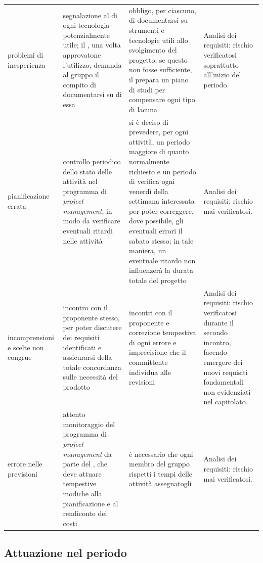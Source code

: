 	
\begin{adjustwidth}{-3cm}{-3cm}
\begin{center}
\begin{tabular}{| p{3cm} | p{3.5cm} | p{4cm} | p{3cm} |}

	problemi di inesperienza & segnalazione al \Rx{} di ogni tecnologia potenzialmente utile; il \Rx{}, una volta approvatone l'utilizzo, demanda al gruppo il compito di documentarsi su di essa & obbligo, per ciascuno, di documentarsi su strumenti e tecnologie utili allo svolgimento del progetto; se questo non fosse sufficiente, il \Rx{} prepara un piano di studi per compensare ogni tipo di lacuna & Analisi dei requisiti: rischio verificatosi soprattutto all'inizio del periodo. \\
	pianificazione errata & controllo periodico dello stato delle attività nel programma di \emph{project management}, in modo da verificare eventuali ritardi nelle attività & si è deciso di prevedere, per ogni attività, un periodo maggiore di quanto normalmente richiesto e un periodo di verifica ogni venerdì della settimana interessata per poter correggere, dove possibile, gli eventuali errori il sabato stesso; in tale maniera, un eventuale ritardo non influenzerà la durata totale del progetto & Analisi dei requisiti: rischio mai verificatosi. \\
	incomprensioni e scelte non congrue & incontro con il proponente stesso, per poter discutere dei requisiti identificati e assicurarsi della totale concordanza sulle necessità del prodotto & incontri con il proponente e correzione tempestiva di ogni errore e imprecisione che il committente individua alle revisioni & Analisi dei requisiti: rischio verificatosi durante il secondo incontro, facendo emergere dei nuovi requisiti fondamentali non evidenziati nel capitolato. \\
	errore nelle previsioni & attento monitoraggio del programma di \emph{project management} da parte del \Rx{}, che deve attuare tempestive modiche alla pianificazione e al rendiconto dei costi & è necessario che ogni membro del gruppo rispetti i tempi delle attività assegnatogli & Analisi dei requisiti: rischio mai verificatosi. \\
	\hline
\end{tabular}
\end{center}
\end{adjustwidth}


\subsection{Attuazione nel periodo}

